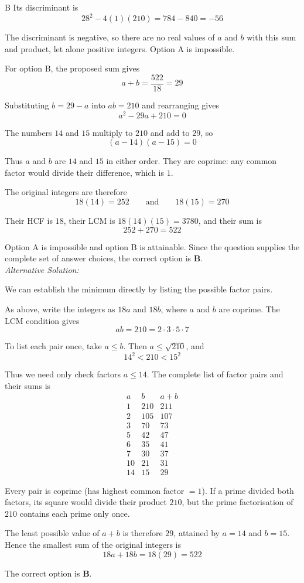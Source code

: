 \documentclass[11pt,a4paper]{article}
\begin{document}
\begin{enumerate}[label=\textbf{\arabic*.},leftmargin=*,itemsep=0pt,start=19]
\begin{djsSolution}{B}
Its discriminant is
\[
28^2-4(1)(210)=784-840=-56
\]

The discriminant is negative, so there are no real values of $a$ and $b$ with this sum and product, let alone positive integers. Option A is impossible.

For option B, the proposed sum gives
\[
a+b=\frac{522}{18}=29
\]

Substituting $b=29-a$ into $ab=210$ and rearranging gives
\[
a^2-29a+210=0
\]

The numbers $14$ and $15$ multiply to $210$ and add to $29$, so
\[
(a-14)(a-15)=0
\]

Thus $a$ and $b$ are $14$ and $15$ in either order. They are coprime: any common factor would divide their difference, which is $1$.

The original integers are therefore
\[
18(14)=252
\qquad\text{and}\qquad
18(15)=270
\]

Their HCF is $18$, their LCM is $18(14)(15)=3780$, and their sum is
\[
252+270=522
\]

Option A is impossible and option B is attainable. Since the question supplies the complete set of answer choices, the correct option is \textbf{B}.\\[5pt]

\textit{Alternative Solution:}

We can establish the minimum directly by listing the possible factor pairs.

As above, write the integers as $18a$ and $18b$, where $a$ and $b$ are coprime. The LCM condition gives
\[
ab=210=2\cdot3\cdot5\cdot7
\]

To list each pair once, take $a\le b$. Then $a\le\sqrt{210}$, and
\[
14^2<210<15^2
\]

Thus we need only check factors $a\le14$. The complete list of factor pairs and their sums is
\[
\begin{array}{c|c|c}
a&b&a+b\\ \hline
1&210&211\\[5pt]
2&105&107\\[5pt]
3&70&73\\[5pt]
5&42&47\\[5pt]
6&35&41\\[5pt]
7&30&37\\[5pt]
10&21&31\\[5pt]
14&15&29
\end{array}
\]

Every pair is coprime (has highest common factor $=1$). If a prime divided both factors, its square would divide their product $210$, but the prime factorisation of $210$ contains each prime only once.

The least possible value of $a+b$ is therefore $29$, attained by $a=14$ and $b=15$. Hence the smallest sum of the original integers is
\[
18a+18b=18(29)=522
\]

The correct option is \textbf{B}.
\end{djsSolution}
\end{enumerate}
\end{document}
